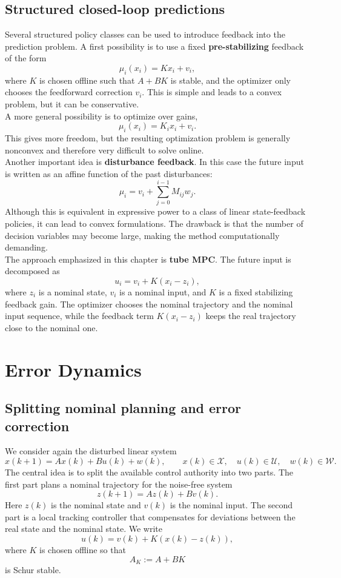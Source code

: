 \subsection{Structured closed-loop predictions}

Several structured policy classes can be used to introduce feedback into the prediction problem.
A first possibility is to use a fixed \textbf{pre-stabilizing} feedback of the form
\[
    \mu_i(x_i)=Kx_i+v_i,
\]
where \(K\) is chosen offline such that \(A+BK\) is stable, and the optimizer only chooses the
feedforward correction \(v_i\). This is simple and leads to a convex problem, but it can be
conservative.\\

A more general possibility is to optimize over  gains,
\[
    \mu_i(x_i)=K_i x_i+v_i.
\]
This gives more freedom, but the resulting optimization problem is generally nonconvex and
therefore very difficult to solve online.\\

Another important idea is \textbf{disturbance feedback}. In this case the future input is written as an
affine function of the past disturbances:
\[
    \mu_i
    =
    v_i+\sum_{j=0}^{i-1}M_{ij}w_j.
\]
Although this is equivalent in expressive power to a class of linear state-feedback policies, it can
lead to convex formulations. The drawback is that the number of decision variables may become
large, making the method computationally demanding.\\

The approach emphasized in this chapter is \textbf{tube MPC}. The future input is decomposed as
\[
    u_i=v_i+K(x_i-z_i),
\]
where \(z_i\) is a nominal state, \(v_i\) is a nominal input, and \(K\) is a fixed stabilizing
feedback gain. The optimizer chooses the nominal trajectory and the nominal input sequence,
while the feedback term \(K(x_i-z_i)\) keeps the real trajectory close to the nominal one.

\section{Error Dynamics}

\subsection{Splitting nominal planning and error correction}

We consider again the disturbed linear system
\[
    x(k+1)=Ax(k)+Bu(k)+w(k),
    \qquad
    x(k)\in\mathcal X,\quad u(k)\in\mathcal U,\quad w(k)\in\mathcal W.
\]
The central idea is to split the available control authority into two parts. The first part plans
a nominal trajectory for the noise-free system
\[
    z(k+1)=Az(k)+Bv(k).
\]
Here \(z(k)\) is the nominal state and \(v(k)\) is the nominal input. The second part is a local
tracking controller that compensates for deviations between the real state and the nominal
state. We write
\[
    u(k)=v(k)+K(x(k)-z(k)),
\]
where \(K\) is chosen offline so that
\[
    A_K:=A+BK
\]
is Schur stable.\\

